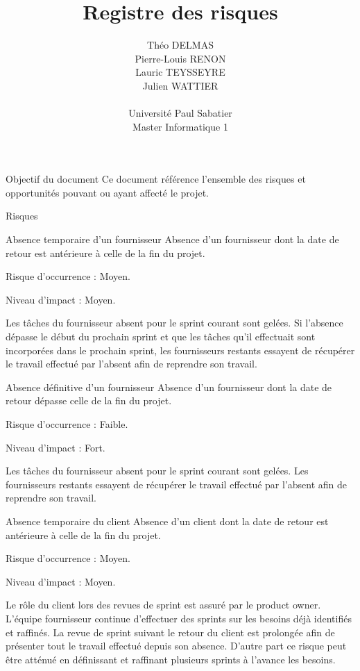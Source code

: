 \documentclass[]{article}
\title{Registre des risques}
\author{
    Théo DELMAS\\
    Pierre-Louis RENON\\
    Lauric TEYSSEYRE\\
    Julien WATTIER\\
    \\
    Université Paul Sabatier\\
    Master Informatique 1\\
   }
\begin{document}
\maketitle
\newpage
\tableofcontents
\newpage

\begin{section}{Objectif du document}
 Ce document référence l'ensemble des risques et opportunités pouvant ou ayant affecté le projet.
\end{section}

{
\setlength{\parindent}{0pt} %
\begin{section}{Risques}
 \begin{subsection}{Absence temporaire d'un fournisseur}
     Absence d'un fournisseur dont la date de retour est antérieure à celle de la fin du projet.

     Risque d’occurrence : Moyen.

     Niveau d’impact : Moyen.

     Les tâches du fournisseur absent pour le sprint courant sont gelées. Si l'absence dépasse le début du prochain sprint et que les tâches qu'il effectuait sont incorporées dans le prochain sprint, les fournisseurs restants essayent de récupérer le travail effectué par l'absent afin de reprendre son travail.
 \end{subsection}

 \begin{subsection}{Absence définitive d'un fournisseur}
     Absence d'un fournisseur dont la date de retour dépasse celle de la fin du projet.

     Risque d’occurrence : Faible.

     Niveau d’impact : Fort.

     Les tâches du fournisseur absent pour le sprint courant sont gelées. Les fournisseurs restants essayent de récupérer le travail effectué par l'absent afin de reprendre son travail.
 \end{subsection}

 \begin{subsection}{Absence temporaire du client}
     Absence d'un client dont la date de retour est antérieure à celle de la fin du projet.

     Risque d’occurrence : Moyen.

     Niveau d’impact : Moyen.

     Le rôle du client lors des revues de sprint est assuré par le product owner. L'équipe fournisseur continue d'effectuer des sprints sur les besoins déjà identifiés et raffinés. La revue de sprint suivant le retour du client est prolongée afin de présenter tout le travail effectué depuis son absence. D'autre part ce risque peut être atténué en définissant et raffinant plusieurs sprints à l'avance les besoins.
 \end{subsection}


\end{section}}
\end{document}
